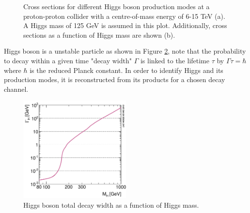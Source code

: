 \begin{figure}[ht]
    \centering
    \caption{Cross sections for different Higgs boson production modes at a proton-proton collider with a centre-of-mass energy of 6-15 TeV (a). A Higgs mass of 125 GeV is assumed in this plot. Additionally, cross sections as a function of Higgs mass are shown (b).}
    \label{fig:chap1:EWSB:HXSEC}
\end{figure}
Higgs boson is a unstable particle as shown in Figure \ref{fig:chap1:EWSB:D}, note that the probability to decay within a given time "decay width" $\Gamma$ is linked to the lifetime $\tau$ by $ \Gamma\tau = \hbar$ where $\hbar$ is the reduced Planck constant. In order to identify Higgs and its production modes, it is reconstructed from its products for a chosen decay channel. 
\begin{figure}[ht]
    \centering
    \includegraphics[width=0.5\textwidth]{Ch1/Img/Higgs_decay.png}
    \caption{Higgs boson total decay width as a function of Higgs mass.}
    \label{fig:chap1:EWSB:D}
\end{figure}

